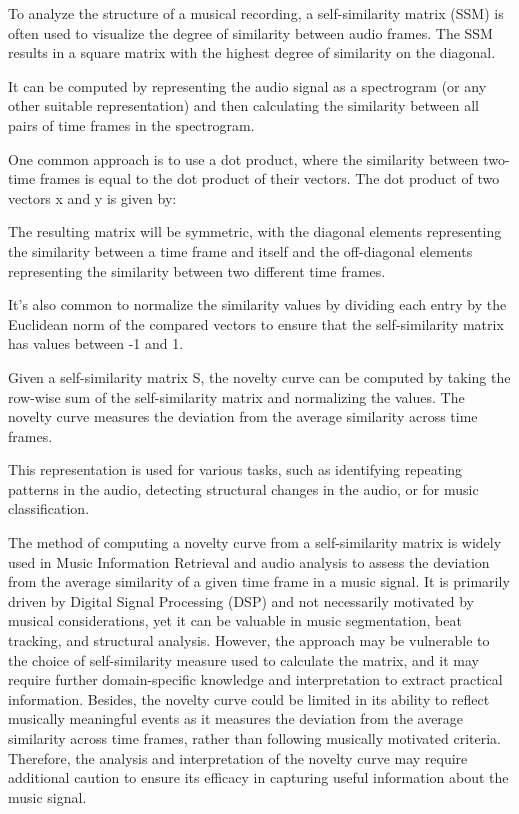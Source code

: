 To analyze the structure of a musical recording, a self-similarity matrix (SSM) is often used to visualize the degree of similarity between audio frames. The SSM results in a square matrix with the highest degree of similarity on the diagonal.

It can be computed by representing the audio signal as a spectrogram (or any other suitable representation) and then calculating the similarity between all pairs of time frames in the spectrogram.

One common approach is to use a dot product, where the similarity between two-time frames is equal to the dot product of their vectors. The dot product of two vectors x and y is given by:



The resulting matrix will be symmetric, with the diagonal elements representing the similarity between a time frame and itself and the off-diagonal elements representing the similarity between two different time frames.

It's also common to normalize the similarity values by dividing each entry by the Euclidean norm of the compared vectors to ensure that the self-similarity matrix has values between -1 and 1.

Given a self-similarity matrix S, the novelty curve can be computed by taking the row-wise sum of the self-similarity matrix and normalizing the values. The novelty curve measures the deviation from the average similarity across time frames.



This representation is used for various tasks, such as identifying repeating patterns in the audio, detecting structural changes in the audio, or for music classification.

The method of computing a novelty curve from a self-similarity matrix is widely used in Music Information Retrieval and audio analysis to assess the deviation from the average similarity of a given time frame in a music signal. It is primarily driven by Digital Signal Processing (DSP) and not necessarily motivated by musical considerations, yet it can be valuable in music segmentation, beat tracking, and structural analysis. However, the approach may be vulnerable to the choice of self-similarity measure used to calculate the matrix, and it may require further domain-specific knowledge and interpretation to extract practical information. Besides, the novelty curve could be limited in its ability to reflect musically meaningful events as it measures the deviation from the average similarity across time frames, rather than following musically motivated criteria. Therefore, the analysis and interpretation of the novelty curve may require additional caution to ensure its efficacy in capturing useful information about the music signal.

